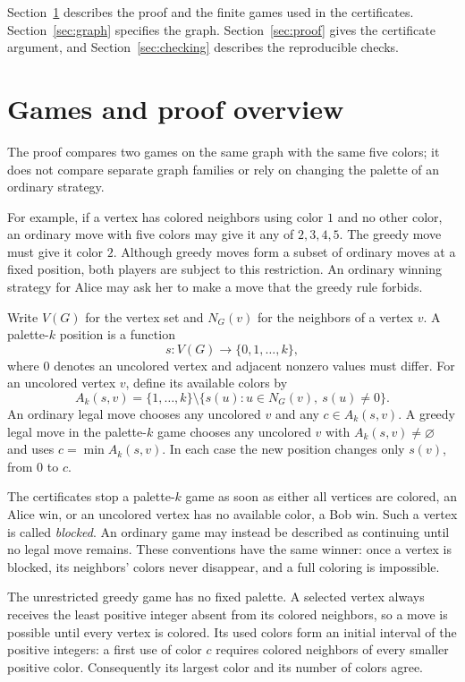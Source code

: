 \documentclass[11pt]{article}
\begin{document}
Section~\ref{sec:overview} describes the proof and the finite games used
in the certificates. Section~\ref{sec:graph} specifies the graph.
Section~\ref{sec:proof} gives the certificate argument, and
Section~\ref{sec:checking} describes the reproducible checks.

\section{Games and proof overview}\label{sec:overview}
The proof compares two games on the same graph with the same five
colors; it does not compare separate graph families or rely on changing
the palette of an ordinary strategy.

For example, if a vertex has colored neighbors using color $1$ and no
other color, an ordinary move with five colors may give it any of
$2,3,4,5$. The greedy move must give it color $2$. Although greedy moves
form a subset of ordinary moves at a fixed position, both players are
subject to this restriction. An ordinary winning strategy for Alice may
ask her to make a move that the greedy rule forbids.

Write $V(G)$ for the vertex set and $N_G(v)$ for the neighbors of a vertex
$v$. A palette-$k$ position is a function
\[
       s:V(G)\longrightarrow\{0,1,\ldots,k\},
\]
where $0$ denotes an uncolored vertex and adjacent nonzero values must
differ. For an uncolored vertex $v$, define its available colors by
\[
 A_k(s,v)=\{1,\ldots,k\}\setminus
              \{s(u):u\in N_G(v),\ s(u)\ne0\}.
\]
An ordinary legal move chooses any uncolored $v$ and any
$c\in A_k(s,v)$. A greedy legal move in the palette-$k$ game chooses
any uncolored $v$ with $A_k(s,v)\ne\varnothing$ and uses
$c=\min A_k(s,v)$. In each case the new position changes only $s(v)$,
from $0$ to $c$.

The certificates stop a palette-$k$ game as soon as either all vertices
are colored, an Alice win, or an uncolored vertex has no available color,
a Bob win. Such a vertex is called \emph{blocked}. An ordinary game may
instead be described as continuing until no legal move remains. These
conventions have the same winner: once a vertex is blocked, its neighbors'
colors never disappear, and a full coloring is impossible.

The unrestricted greedy game has no fixed palette. A selected vertex
always receives the least positive integer absent from its colored
neighbors, so a move is possible until every vertex is colored. Its used
colors form an initial interval of the positive integers: a first use
of color $c$ requires colored neighbors of every smaller positive color.
Consequently its largest color and its number of colors agree.
\end{document}
